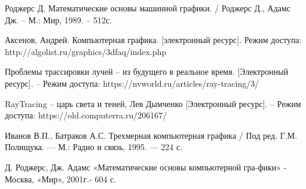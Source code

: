 \documentclass[12pt,a4paper,oneside]{report}
\begin{document}
	
	\renewcommand{\bibname}{Список использованной литературы}
	\begin{thebibliography}{2}
		 Роджерс Д. Математические основы машинной графики. / Роджерс Д., Адамс Дж.  – М.: Мир, 1989. – 512с. 
		
		 Аксенов, Андрей. Компьютерная графика.  [электронный ресурс]. Режим доступа:
		http://algolist.ru/graphics/3dfaq/index.php
		
		
		 Проблемы трассировки лучей – из будущего в реальное время. [Электронный ресурс]. – Режим доступа: https://nvworld.ru/articles/ray-tracing/3/ 
		
		 RayTracing – царь света и теней, Лев Дымченко [Электронный ресурс]. – Режим доступа: https://old.computerra.ru/206167/
		
		Иванов В.П., Батраков А.С. Трехмерная компьютерная 
		графика / Под ред. Г.М. Полищука. — М.: Радио и связь, 1995. — 224 с.
		
		Д. Роджерс, Дж. Адамс «Математические основы компьютерной гра-фики» - Москва, «Мир», 2001г.- 604 с.
		
	\end{thebibliography}
	
\end{document}
